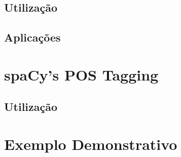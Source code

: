 \documentclass[12pt]{article}
\begin{document}

\subsection{Utilização} %




\subsection{Aplicações}



\section{spaCy's POS Tagging} %


\subsection{Utilização} %


\section{Exemplo Demonstrativo} %






\end{document}
